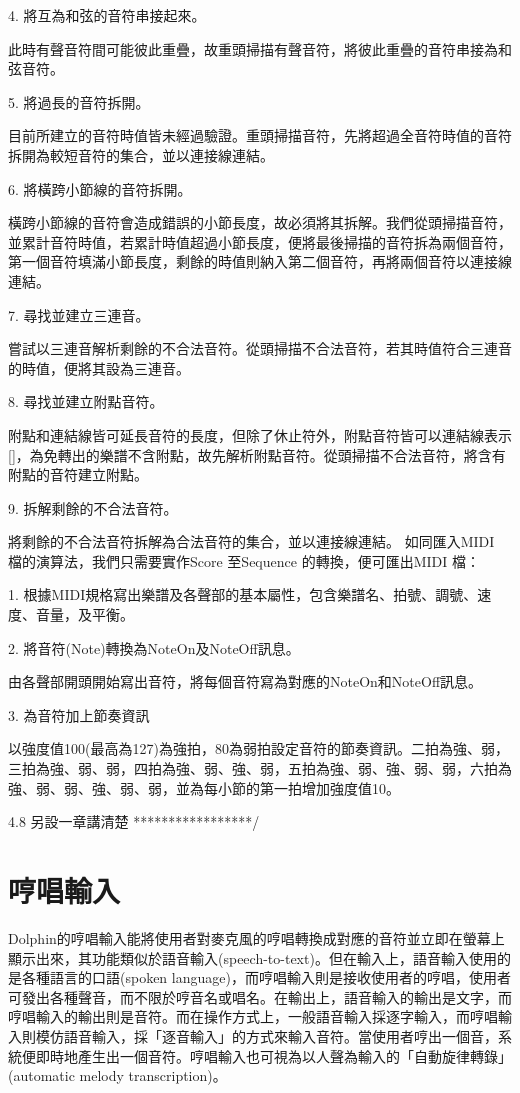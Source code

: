 \documentclass[12pt,a4paper,oneside]{report}
\begin{document}
4. 將互為和弦的音符串接起來。 

此時有聲音符間可能彼此重疊，故重頭掃描有聲音符，將彼此重疊的音符串接為和弦音符。

5. 將過長的音符拆開。 

目前所建立的音符時值皆未經過驗證。重頭掃描音符，先將超過全音符時值的音符拆開為較短音符的集合，並以連接線連結。

6. 將橫跨小節線的音符拆開。

橫跨小節線的音符會造成錯誤的小節長度，故必須將其拆解。我們從頭掃描音符，並累計音符時值，若累計時值超過小節長度，便將最後掃描的音符拆為兩個音符，第一個音符填滿小節長度，剩餘的時值則納入第二個音符，再將兩個音符以連接線連結。

7. 尋找並建立三連音。 

嘗試以三連音解析剩餘的不合法音符。從頭掃描不合法音符，若其時值符合三連音的時值，便將其設為三連音。

8. 尋找並建立附點音符。

附點和連結線皆可延長音符的長度，但除了休止符外，附點音符皆可以連結線表示[]，為免轉出的樂譜不含附點，故先解析附點音符。從頭掃描不合法音符，將含有附點的音符建立附點。

9. 拆解剩餘的不合法音符。

將剩餘的不合法音符拆解為合法音符的集合，並以連接線連結。
如同匯入MIDI 檔的演算法，我們只需要實作Score 至Sequence 的轉換，便可匯出MIDI 檔：

1. 根據MIDI規格寫出樂譜及各聲部的基本屬性，包含樂譜名、拍號、調號、速度、音量，及平衡。 

2. 將音符(Note)轉換為NoteOn及NoteOff訊息。 

由各聲部開頭開始寫出音符，將每個音符寫為對應的NoteOn和NoteOff訊息。

3. 為音符加上節奏資訊

以強度值100(最高為127)為強拍，80為弱拍設定音符的節奏資訊。二拍為強、弱，三拍為強、弱、弱，四拍為強、弱、強、弱，五拍為強、弱、強、弱、弱，六拍為強、弱、弱、強、弱、弱，並為每小節的第一拍增加強度值10。

 4.8 另設一章講清楚  *****************/


\chapter{哼唱輸入}

Dolphin的哼唱輸入能將使用者對麥克風的哼唱轉換成對應的音符並立即在螢幕上顯示出來，其功能類似於語音輸入(speech-to-text)。但在輸入上，語音輸入使用的是各種語言的口語(spoken language)，而哼唱輸入則是接收使用者的哼唱，使用者可發出各種聲音，而不限於哼音名或唱名。在輸出上，語音輸入的輸出是文字，而哼唱輸入的輸出則是音符。而在操作方式上，一般語音輸入採逐字輸入，而哼唱輸入則模仿語音輸入，採「逐音輸入」的方式來輸入音符。當使用者哼出一個音，系統便即時地產生出一個音符。哼唱輸入也可視為以人聲為輸入的「自動旋律轉錄」(automatic melody transcription)。
\end{document}
